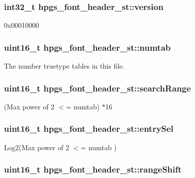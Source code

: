 \subsubsection[version]{\setlength{\rightskip}{0pt plus 5cm}int32\_\-t {\bf hpgs\_\-font\_\-header\_\-st::version}}\label{structhpgs__font__header__st_d3ab0f4f9723b09428d611c04dbf66bf}


0x00010000 
\subsubsection[numtab]{\setlength{\rightskip}{0pt plus 5cm}uint16\_\-t {\bf hpgs\_\-font\_\-header\_\-st::numtab}}\label{structhpgs__font__header__st_73194636df1a30d97c3892baec5fcee1}


The number truetype tables in this file. 
\subsubsection[searchRange]{\setlength{\rightskip}{0pt plus 5cm}uint16\_\-t {\bf hpgs\_\-font\_\-header\_\-st::searchRange}}\label{structhpgs__font__header__st_668c08868584b25e54cafc16f1a35d73}


(Max power of 2 $<$= numtab) $\ast$16 
\subsubsection[entrySel]{\setlength{\rightskip}{0pt plus 5cm}uint16\_\-t {\bf hpgs\_\-font\_\-header\_\-st::entrySel}}\label{structhpgs__font__header__st_48dab4c81c63193d84f92f343bd5f913}


Log2(Max power of 2 $<$= numtab ) 
\subsubsection[rangeShift]{\setlength{\rightskip}{0pt plus 5cm}uint16\_\-t {\bf hpgs\_\-font\_\-header\_\-st::rangeShift}}\label{structhpgs__font__header__st_cd34db3fd2dd32cb4f492390a9dd208f}


